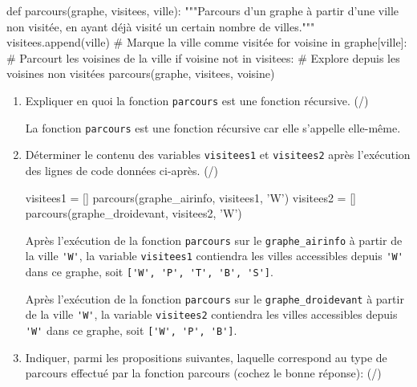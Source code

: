 \begin{CodePythontexAlt}[TaillePolice=\large, Largeur=1\linewidth,Centre,Lignes=true,PremLigne=1]{}
def parcours(graphe, visitees, ville):
    """Parcours d'un graphe à partir d'une ville non visitée, 
    en ayant déjà visité un certain nombre de villes."""
    visitees.append(ville)              # Marque la ville comme visitée
    for voisine in graphe[ville]:       # Parcourt les voisines de la ville
        if voisine not in visitees:
            # Explore depuis les voisines non visitées
            parcours(graphe, visitees, voisine)  
\end{CodePythontexAlt}

\pagebreak

\begin{enumerate}[resume=monDS]
\item  Expliquer en quoi la fonction \texttt{parcours} est une fonction récursive. (/)
\begin{blocvisible}[height=1.5]
    La fonction \texttt{parcours} est une fonction récursive car elle s'appelle elle-même. 
\end{blocvisible}

\medskip

\item Déterminer le contenu des variables \texttt{visitees1} et \texttt{visitees2} après l'exécution des lignes de code données ci-après. (/)

\begin{CodePythontexAlt}[TaillePolice=\large, Largeur=1\linewidth,Centre,Lignes=true,PremLigne=1]{}
visitees1 = []
parcours(graphe_airinfo, visitees1, 'W')
visitees2 = []
parcours(graphe_droidevant, visitees2, 'W')
\end{CodePythontexAlt}

\begin{blocvisible}[height=3]
    Après l'exécution de la fonction \texttt{parcours} sur le \texttt{graphe\_airinfo} à partir de la ville \verb|'W'|, la variable \texttt{visitees1} contiendra les villes accessibles depuis \verb|'W'| dans ce graphe, soit \verb|['W', 'P', 'T', 'B', 'S']|.

    Après l'exécution de la fonction \texttt{parcours} sur le \texttt{graphe\_droidevant} à partir de la ville \verb|'W'|, la variable \texttt{visitees2} contiendra les villes accessibles depuis \verb|'W'| dans ce graphe, soit \verb|['W', 'P', 'B']|.
\end{blocvisible}

\medskip
\item Indiquer, parmi les propositions suivantes, laquelle correspond au type de parcours effectué par la fonction parcours (cochez le bonne réponse): (/)



\end{enumerate}
